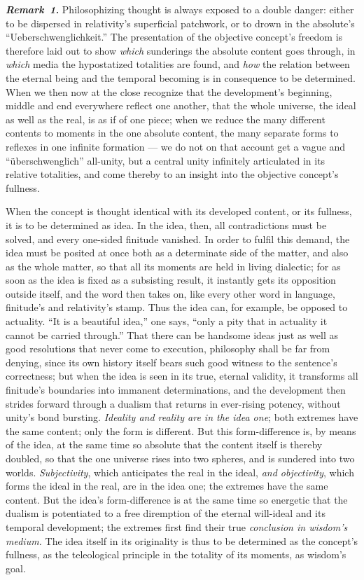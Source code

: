 \documentclass[12pt]{book}
\newcommand{\anm}[1]{\emph{\textbf{Remark~#1.}}}
\begin{document}
\anm{1} Philosophizing thought is always exposed to a double danger: either
to be dispersed in relativity's superficial patchwork, or to drown in the
absolute's ``Ueberschwenglichkeit.'' The presentation of the objective
concept's freedom is therefore laid out to show \emph{which} sunderings the
absolute content goes through, in \emph{which} media the hypostatized
totalities are found, and \emph{how} the relation between the eternal being
and the temporal becoming is in consequence to be determined. When we then
now at the close recognize that the development's beginning, middle and end
everywhere reflect one another, that the whole universe, the ideal as well
as the real, is as if of one piece; when we reduce the many different
contents to moments in the one absolute content, the many separate forms to
reflexes in one infinite formation --- we do not on that account get a vague
and ``überschwenglich'' all-unity, but a central unity infinitely
articulated in its relative totalities, and come thereby to an insight into
the objective concept's fullness.

When the concept is thought identical with its developed content, or its
fullness, it is to be determined as idea. In the idea, then, all
contradictions must be solved, and every one-sided finitude vanished. In
order to fulfil this demand, the idea must be posited at once both as a
determinate side of the matter, and also as the whole matter, so that all
its moments are held in living dialectic; for as soon as the idea is fixed
as a subsisting result, it instantly gets its opposition outside itself, and
the word then takes on, like every other word in language, finitude's and
relativity's stamp. Thus the idea can, for example, be opposed to
actuality. ``It is a beautiful idea,'' one says, ``only a pity that in
actuality it cannot be carried through.'' That there can be handsome ideas
just as well as good resolutions that never come to execution, philosophy
shall be far from denying, since its own history itself bears such good
witness to the sentence's correctness; but when the idea is seen in its
true, eternal validity, it transforms all finitude's boundaries into
immanent determinations, and the development then strides forward through a
dualism that returns in ever-rising potency, without unity's bond bursting.
\emph{Ideality and reality are in the idea one}; both extremes have the same
content; only the form is different. But this form-difference is, by means
of the idea, at the same time so absolute that the content itself is thereby
doubled, so that the one universe rises into two spheres, and is sundered
into two worlds. \emph{Subjectivity}, which anticipates the real in the
ideal, \emph{and objectivity}, which forms the ideal in the real, are in the
idea one; the extremes have the same content. But the idea's form-difference
is at the same time so energetic that the dualism is potentiated to a free
diremption of the eternal will-ideal and its temporal development; the
extremes first find their true \emph{conclusion in wisdom's medium.} The
idea itself in its originality is thus to be determined as the concept's
fullness, as the teleological principle in the totality of its moments, as
wisdom's goal.
\end{document}
